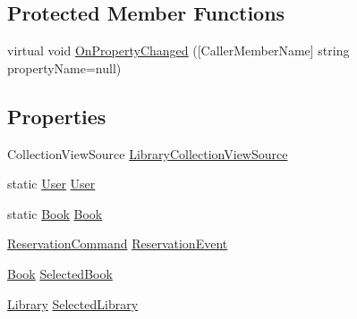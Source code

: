 \subsection*{Protected Member Functions}
\begin{DoxyCompactItemize}
\item 
virtual void \mbox{\hyperlink{class_easy_library_application_1_1_w_p_f_1_1_view_model_1_1_reservation_view_model_a710689b3254ccbb4353fe2b270485eb4}{On\+Property\+Changed}} (\mbox{[}Caller\+Member\+Name\mbox{]} string property\+Name=null)
\end{DoxyCompactItemize}
\subsection*{Properties}
\begin{DoxyCompactItemize}
\item 
Collection\+View\+Source \mbox{\hyperlink{class_easy_library_application_1_1_w_p_f_1_1_view_model_1_1_reservation_view_model_a0c62f64982854a18eab60ae6a0f7c5bb}{Library\+Collection\+View\+Source}}
\item 
static \mbox{\hyperlink{class_easy_library_application_1_1_w_p_f_1_1_model_1_1_user}{User}} \mbox{\hyperlink{class_easy_library_application_1_1_w_p_f_1_1_view_model_1_1_reservation_view_model_a2988b4ee797b1a82f47a4d400100c285}{User}}
\item 
static \mbox{\hyperlink{class_easy_library_application_1_1_w_p_f_1_1_model_1_1_book}{Book}} \mbox{\hyperlink{class_easy_library_application_1_1_w_p_f_1_1_view_model_1_1_reservation_view_model_a9bd4f93fd0c94aaf342deb4f6f45ec80}{Book}}
\item 
\mbox{\hyperlink{class_easy_library_application_1_1_w_p_f_1_1_commands_1_1_reservation_command}{Reservation\+Command}} \mbox{\hyperlink{class_easy_library_application_1_1_w_p_f_1_1_view_model_1_1_reservation_view_model_ad80ff28a80df5e460288aa23c08e228c}{Reservation\+Event}}
\item 
\mbox{\hyperlink{class_easy_library_application_1_1_w_p_f_1_1_model_1_1_book}{Book}} \mbox{\hyperlink{class_easy_library_application_1_1_w_p_f_1_1_view_model_1_1_reservation_view_model_a7f20b1436daa564d6434cfb10518053f}{Selected\+Book}}
\item 
\mbox{\hyperlink{class_easy_library_application_1_1_w_p_f_1_1_model_1_1_library}{Library}} \mbox{\hyperlink{class_easy_library_application_1_1_w_p_f_1_1_view_model_1_1_reservation_view_model_a2383fb2f751b39318554ee0aa1971104}{Selected\+Library}}
\end{DoxyCompactItemize}
